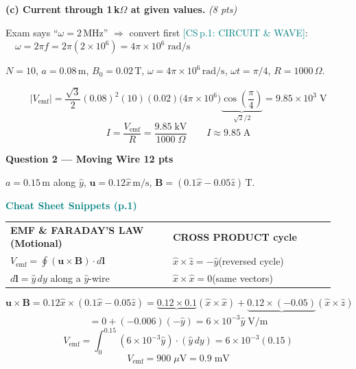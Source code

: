 \documentclass[11pt,letterpaper]{article}
\newcommand{\cs}[1]{\textcolor{teal}{\footnotesize[CS\,#1]}}
\begin{document}
\textbf{(c) Current through 1\,k$\Omega$ at given values.} \hfill\textit{(8 pts)}

\begin{notebox}
Exam says ``$\omega=2\,\text{MHz}$'' $\Rightarrow$ convert first \cs{p.1: CIRCUIT \& WAVE}:
$\quad\omega = 2\pi f = 2\pi(2\times10^6) = 4\pi\times10^6\;\text{rad/s}$
\end{notebox}

$N=10$,\; $a=0.08\,\text{m}$,\; $B_0=0.02\,\text{T}$,\; $\omega=4\pi\times10^6\,\text{rad/s}$,\;
$\omega t=\pi/4$,\; $R=1000\,\Omega$.

\[
|V_\text{emf}| = \frac{\sqrt{3}}{2}(0.08)^2(10)(0.02)\bigl(4\pi\times10^6\bigr)
\underbrace{\cos\!\left(\frac{\pi}{4}\right)}_{\sqrt{2}/2}
= 9.85\times10^3\;\text{V}
\]
\[
I = \frac{V_\text{emf}}{R} = \frac{9.85\;\text{kV}}{1000\;\Omega}
\qquad\boxed{I \approx 9.85\;\text{A}}
\]

\newpage
\colorbox{purplebg}{\parbox{\dimexpr\linewidth-2\fboxsep}{\color{purple}\large\textbf{Question 2 --- Moving Wire \hfill 12 pts}}}

\vspace{4pt}
$a=0.15\,\text{m}$ along $\hat{y}$,\quad
$\mathbf{u}=0.12\hat{x}\,\text{m/s}$,\quad
$\mathbf{B}=(0.1\hat{x}-0.05\hat{z})\,\text{T}$.

\begin{cssnip}
\textbf{\small\textcolor{teal}{Cheat Sheet Snippets (p.1)}}\\[3pt]
\begin{tabular}{@{}p{0.47\linewidth}p{0.47\linewidth}@{}}
\textbf{EMF \& FARADAY'S LAW (Motional)} & \textbf{CROSS PRODUCT cycle}\\
$V_\text{emf}=\displaystyle\oint(\mathbf{u}\times\mathbf{B})\cdot d\mathbf{l}$ &
$\hat{x}\times\hat{z}=-\hat{y}$\quad(reversed cycle)\\[4pt]
$d\mathbf{l}=\hat{y}\,dy$ along a $\hat{y}$-wire &
$\hat{x}\times\hat{x}=0$\quad(same vectors)
\end{tabular}
\end{cssnip}

\[
\mathbf{u}\times\mathbf{B}
= 0.12\hat{x}\times(0.1\hat{x}-0.05\hat{z})
= \underbrace{0.12\times0.1}_{}(\hat{x}\times\hat{x})
  +\underbrace{0.12\times(-0.05)}_{}(\hat{x}\times\hat{z})
\]
\[
= 0 + (-0.006)(-\hat{y}) = 6\times10^{-3}\hat{y}\;\text{V/m}
\]
\[
V_\text{emf} = \int_0^{0.15}(6\times10^{-3}\hat{y})\cdot(\hat{y}\,dy)
= 6\times10^{-3}(0.15)
\]
\[
\boxed{V_\text{emf} = 900\;\mu\text{V} = 0.9\;\text{mV}}
\]
\end{document}
